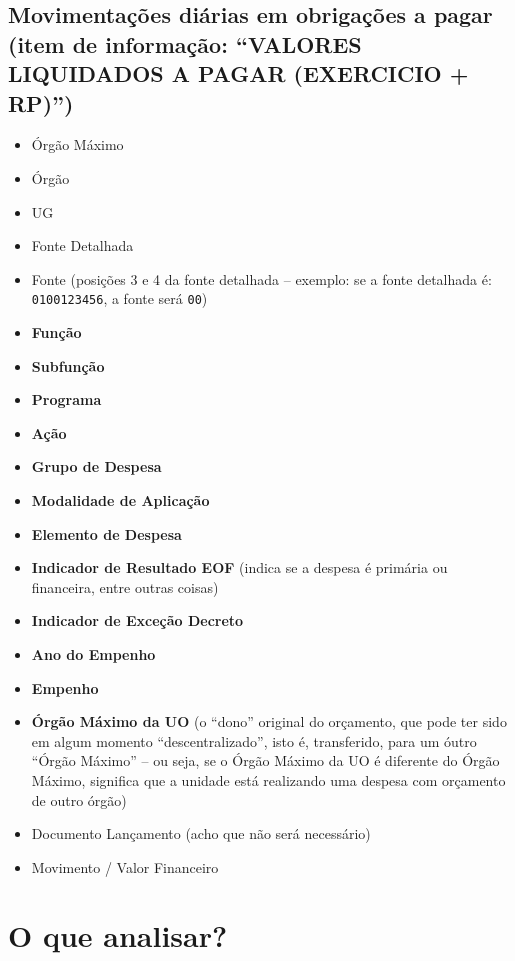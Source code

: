 \documentclass[]{book}
\providecommand{\tightlist}{%
  \setlength{\itemsep}{0pt}\setlength{\parskip}{0pt}}
\begin{document}
\hypertarget{movimentauxe7uxf5es-diuxe1rias-em-obrigauxe7uxf5es-a-pagar-item-de-informauxe7uxe3o-valores-liquidados-a-pagar-exercicio-rp}{%
\subsection{Movimentações diárias em obrigações a pagar (item de informação: ``VALORES LIQUIDADOS A PAGAR (EXERCICIO + RP)'')}\label{movimentauxe7uxf5es-diuxe1rias-em-obrigauxe7uxf5es-a-pagar-item-de-informauxe7uxe3o-valores-liquidados-a-pagar-exercicio-rp}}

\begin{itemize}
\tightlist
\item
  Órgão Máximo
\item
  Órgão
\item
  UG
\item
  Fonte Detalhada
\item
  Fonte (posições 3 e 4 da fonte detalhada -- exemplo: se a fonte detalhada é: \texttt{0100123456}, a fonte será \texttt{00})
\item
  \textbf{Função}
\item
  \textbf{Subfunção}
\item
  \textbf{Programa}
\item
  \textbf{Ação}
\item
  \textbf{Grupo de Despesa}
\item
  \textbf{Modalidade de Aplicação}
\item
  \textbf{Elemento de Despesa}
\item
  \textbf{Indicador de Resultado EOF} (indica se a despesa é primária ou financeira, entre outras coisas)
\item
  \textbf{Indicador de Exceção Decreto}
\item
  \textbf{Ano do Empenho}
\item
  \textbf{Empenho}
\item
  \textbf{Órgão Máximo da UO} (o ``dono'' original do orçamento, que pode ter sido em algum momento ``descentralizado'', isto é, transferido, para um óutro ``Órgão Máximo'' -- ou seja, se o Órgão Máximo da UO é diferente do Órgão Máximo, significa que a unidade está realizando uma despesa com orçamento de outro órgão)
\item
  Documento Lançamento (acho que não será necessário)
\item
  Movimento / Valor Financeiro
\end{itemize}

\hypertarget{o-que-analisar}{%
\section{O que analisar?}\label{o-que-analisar}}
\end{document}
